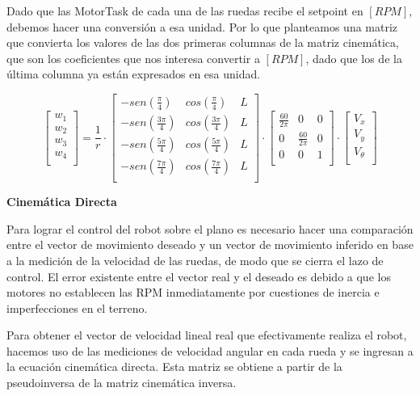 Dado que las MotorTask de cada una de las ruedas recibe el setpoint en $[RPM]$, debemos hacer una conversión a esa unidad. Por lo que planteamos una matriz que convierta los valores de las dos primeras columnas de la matriz cinemática, que son los coeficientes que nos interesa convertir a $[RPM]$, dado que los de la última columna ya están expresados en esa unidad.

$$ \begin{bmatrix} w_1 \\ w_2 \\ w_3 \\ w_4 \\ \end{bmatrix} =
    \frac{1}{r}
    \cdot
    \begin{bmatrix}
        {-sen(\frac{\pi}{4})} & {cos( \frac{\pi}{4})} & L \\
        {-sen(\frac{3\pi}{4})} & {cos(\frac{3\pi}{4})} & L \\
        {-sen(\frac{5\pi}{4})} & {cos(\frac{5\pi}{4})} & L \\
        {-sen(\frac{7\pi}{4})} & {cos(\frac{7\pi}{4})} & L \\
    \end{bmatrix}
    \cdot
    \begin{bmatrix}
        {\frac{60}{2 \pi}} & {0} & {0} \\
        {0} & {\frac{60}{2 \pi}} & {0} \\
        {0} & {0} & {1}                \\
    \end{bmatrix}
    \cdot
    \begin{bmatrix} V_x \\ V_y \\ V_\theta \\ \end{bmatrix} $$


\textbf{Cinemática Directa} \mbox{} \vspace{8pt}

Para lograr el control del robot sobre el plano es necesario hacer una comparación entre el vector de movimiento deseado y un vector de movimiento inferido en base a la medición de la velocidad de las ruedas, de modo que se cierra el lazo de control. El error existente entre el vector real y el deseado es debido a que los motores no establecen las RPM inmediatamente por cuestiones de inercia e imperfecciones en el terreno.

Para obtener el vector de velocidad lineal real que efectivamente realiza el robot, hacemos uso de las mediciones de velocidad angular en cada rueda y se ingresan a la ecuación cinemática directa. Esta matriz se obtiene a partir de la pseudoinversa de la matriz cinemática inversa. \cite{islassistcontrolomni}

